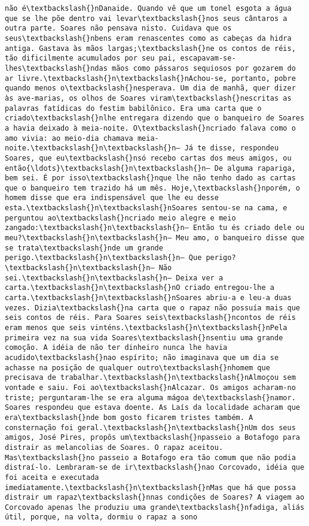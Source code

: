 \begin{Verbatim}[commandchars=\\\{\}]
não é\textbackslash{}nDanaide. Quando vê que um tonel esgota a água que se lhe põe dentro vai levar\textbackslash{}nos seus cântaros a outra parte. Soares não pensava nisto. Cuidava que os seus\textbackslash{}nbens eram renascentes como as cabeças da hidra antiga. Gastava às mãos largas;\textbackslash{}ne os contos de réis, tão dificilmente acumulados por seu pai, escapavam-se-lhes\textbackslash{}ndas mãos como pássaros sequiosos por gozarem do ar livre.\textbackslash{}n\textbackslash{}nAchou-se, portanto, pobre quando menos o\textbackslash{}nesperava. Um dia de manhã, quer dizer às ave-marias, os olhos de Soares viram\textbackslash{}nescritas as palavras fatídicas do festim babilônico. Era uma carta que o criado\textbackslash{}nlhe entregara dizendo que o banqueiro de Soares a havia deixado à meia-noite. O\textbackslash{}ncriado falava como o amo vivia: ao meio-dia chamava meia-noite.\textbackslash{}n\textbackslash{}n— Já te disse, respondeu Soares, que eu\textbackslash{}nsó recebo cartas dos meus amigos, ou então{\ldots}\textbackslash{}n\textbackslash{}n— De alguma rapariga, bem sei. É por isso\textbackslash{}nque lhe não tenho dado as cartas que o banqueiro tem trazido há um mês. Hoje,\textbackslash{}nporém, o homem disse que era indispensável que lhe eu desse esta.\textbackslash{}n\textbackslash{}nSoares sentou-se na cama, e perguntou ao\textbackslash{}ncriado meio alegre e meio zangado:\textbackslash{}n\textbackslash{}n— Então tu és criado dele ou meu?\textbackslash{}n\textbackslash{}n— Meu amo, o banqueiro disse que se trata\textbackslash{}nde um grande perigo.\textbackslash{}n\textbackslash{}n— Que perigo?\textbackslash{}n\textbackslash{}n— Não sei.\textbackslash{}n\textbackslash{}n— Deixa ver a carta.\textbackslash{}n\textbackslash{}nO criado entregou-lhe a carta.\textbackslash{}n\textbackslash{}nSoares abriu-a e leu-a duas vezes. Dizia\textbackslash{}na carta que o rapaz não possuía mais que seis contos de réis. Para Soares seis\textbackslash{}ncontos de réis eram menos que seis vinténs.\textbackslash{}n\textbackslash{}nPela primeira vez na sua vida Soares\textbackslash{}nsentiu uma grande comoção. A idéia de não ter dinheiro nunca lhe havia acudido\textbackslash{}nao espírito; não imaginava que um dia se achasse na posição de qualquer outro\textbackslash{}nhomem que precisava de trabalhar.\textbackslash{}n\textbackslash{}nAlmoçou sem vontade e saiu. Foi ao\textbackslash{}nAlcazar. Os amigos acharam-no triste; perguntaram-lhe se era alguma mágoa de\textbackslash{}namor. Soares respondeu que estava doente. As Laís da localidade acharam que era\textbackslash{}nde bom gosto ficarem tristes também. A consternação foi geral.\textbackslash{}n\textbackslash{}nUm dos seus amigos, José Pires, propôs um\textbackslash{}npasseio a Botafogo para distrair as melancolias de Soares. O rapaz aceitou. Mas\textbackslash{}no passeio a Botafogo era tão comum que não podia distraí-lo. Lembraram-se de ir\textbackslash{}nao Corcovado, idéia que foi aceita e executada imediatamente.\textbackslash{}n\textbackslash{}nMas que há que possa distrair um rapaz\textbackslash{}nnas condições de Soares? A viagem ao Corcovado apenas lhe produziu uma grande\textbackslash{}nfadiga, aliás útil, porque, na volta, dormiu o rapaz a sono 
\end{Verbatim}
